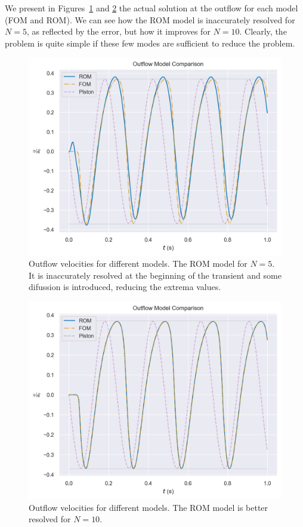 \documentclass[../../thesis.tex]{subfiles}
\begin{document}
We present in Figures~\ref{fig:outflow_model_comparison_N_5} 
and \ref{fig:outflow_model_comparison_N_10} 
the actual solution at the outflow for each model (FOM and ROM).
We can see how the ROM model is inaccurately resolved for $N=5$, as reflected by the error,
but how it improves for $N=10$.
Clearly, the problem is quite simple if these few modes are sufficient to reduce the problem.
\begin{figure}[h]
    \centering
    \includegraphics[width=\columnwidth]{research_project/piston/figures/rb_certification/outflow_probes_comparison_rom_5_srom_15_online_4.png}
    \caption{Outflow velocities for different models. The ROM model for $N=5$. 
    It is inaccurately resolved at the beginning of the transient 
    and some difussion is introduced, reducing the extrema values.}
    \label{fig:outflow_model_comparison_N_5}
\end{figure}
\begin{figure}[h]
    \centering
    \includegraphics[width=\columnwidth]{research_project/piston/figures/rb_certification/outflow_probes_comparison_rom_10_srom_20_online_4.png}
    \caption{Outflow velocities for different models. 
    The ROM model is better resolved for $N=10$.}
    \label{fig:outflow_model_comparison_N_10}
\end{figure}
\end{document}
